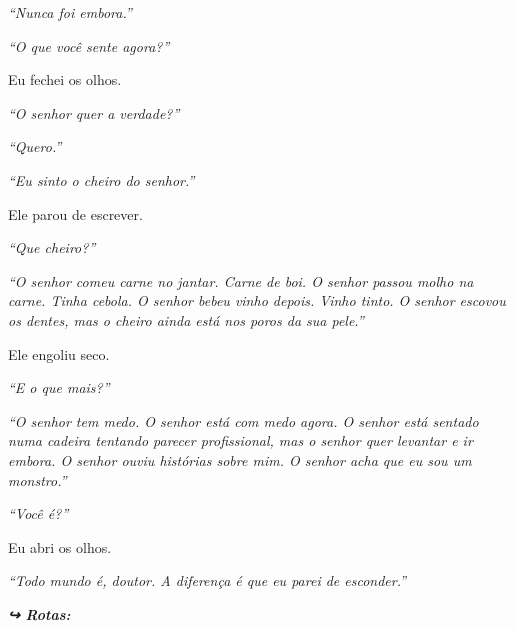 \noindent \textit{\textquotedblleft{}Nunca foi embora.\textquotedblright{}}

\noindent \textit{\textquotedblleft{}O que você sente agora?\textquotedblright{}}

\noindent Eu fechei os olhos.

\noindent \textit{\textquotedblleft{}O senhor quer a verdade?\textquotedblright{}}

\noindent \textit{\textquotedblleft{}Quero.\textquotedblright{}}

\noindent \textit{\textquotedblleft{}Eu sinto o cheiro do senhor.\textquotedblright{}}

\noindent Ele parou de escrever.

\noindent \textit{\textquotedblleft{}Que cheiro?\textquotedblright{}}

\noindent \textit{\textquotedblleft{}O senhor comeu carne no jantar. Carne de boi. O senhor passou molho na carne. Tinha cebola. O senhor bebeu vinho depois. Vinho tinto. O senhor escovou os dentes, mas o cheiro ainda está nos poros da sua pele.\textquotedblright{}}

\noindent Ele engoliu seco.

\noindent \textit{\textquotedblleft{}E o que mais?\textquotedblright{}}

\noindent \textit{\textquotedblleft{}O senhor tem medo. O senhor está com medo agora. O senhor está sentado numa cadeira tentando parecer profissional, mas o senhor quer levantar e ir embora. O senhor ouviu histórias sobre mim. O senhor acha que eu sou um monstro.\textquotedblright{}}

\noindent \textit{\textquotedblleft{}Você é?\textquotedblright{}}

\noindent Eu abri os olhos.

\noindent \textit{\textquotedblleft{}Todo mundo é, doutor. A diferença é que eu parei de esconder.\textquotedblright{}}

\vspace{0.5em}
\noindent\textit{\textbf{↪ Rotas:}  \rotasep {} \rotasep {}}